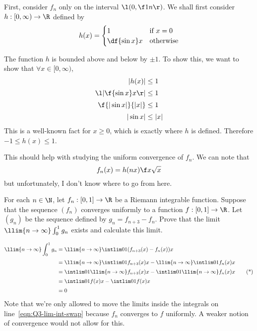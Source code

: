 \documentclass[a4paper]{article}
\begin{document}
First, consider $f_n$ only on the interval $\l( 0, \f1n \r)$. We shall first consider $h : [0, \infty) \to \R$ defined by \[ %
h(x) = \begin{cases}
1 & \text{if } x = 0 \\
\df{\sin x}x & \text{otherwise}
\end{cases}
\]

The function $h$ is bounded above and below by $\pm 1$. To show this, we want to show that $\forall x \in [0, \infty)$, %
\begin{align*}
|h(x)| &\le 1 \\[0.5ex]
\l| \f{\sin x}x \r| &\le 1 \\[0.5ex]
\f{|\sin x|}{|x|} &\le 1 \\[0.5ex]
|\sin x| &\le |x|
\end{align*}
This is a well-known fact for $x \ge 0$, which is exactly where $h$ is defined. Therefore $-1 \le h(x) \le 1$.

This should help with studying the uniform convergence of $f_n$. We can note that \[ f_n(x) = h(nx) \f x{\sqrt x} \] but unfortunately, I don't know where to go from here.




\begin{questionbody}
For each $n \in \N$, let $f_n : [0, 1] \to \R$ be a Riemann integrable function. Suppose that the sequence $(f_n)$ converges uniformly to a function $f : [0, 1] \to \R$. Let $(g_n)$ be the sequence defined by $g_n = f_{n+3} - f_n$. Prove that the limit $\llim{n \to \infty} \int_0^1 g_n$ exists and calculate this limit.
\end{questionbody}


\begin{align*}
\llim{n \to \infty} \int_0^1 g_n &= \llim{n \to \infty} \intlim 01 {( f_{n+3}(x) - f_n(x) )} x \\[0.5ex]
&= \llim{n \to \infty} \intlim 01 {f_{n+3}(x)} x - \llim{n \to \infty} \intlim 01 {f_n(x)} x \\[0.5ex]
&= \intlim 01 {\llim{n \to \infty} f_{n+3}(x)} x - \intlim 01 {\llim{n \to \infty} f_n(x)} x \tag{*}\label{eqn:Q3-lim-int-swap} \\[0.5ex]
&= \intlim 01 {f(x)} x - \intlim 01 {f(x)} x \\[0.5ex]
&= 0
\end{align*}
Note that we're only allowed to move the limits inside the integrals on line~\eqref{eqn:Q3-lim-int-swap} because $f_n$ converges to $f$ uniformly. A weaker notion of convergence would not allow for this.
\end{document}
